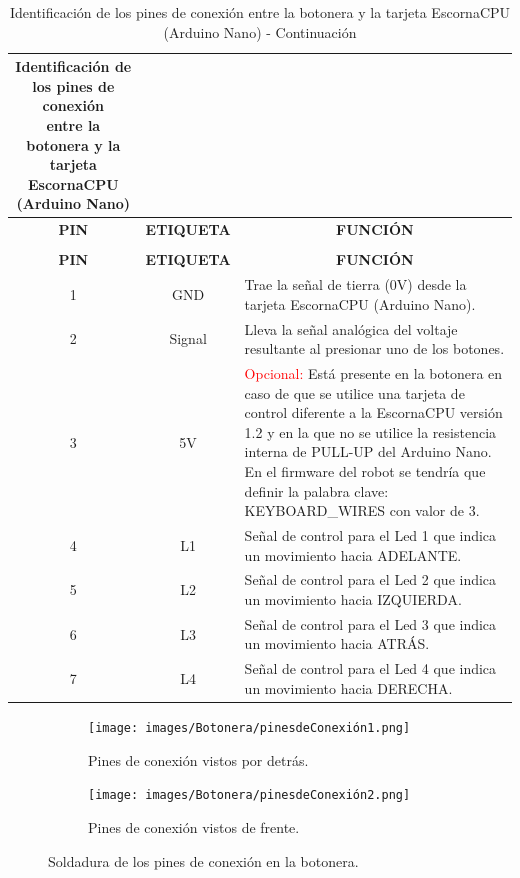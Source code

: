 \documentclass{article}
\begin{document}
\begin{longtable}{|c|c|m{}|}
    \caption{Identificación de los pines de conexión \\ entre la botonera y la tarjeta EscornaCPU (Arduino Nano)} \label{tab:pines_de_conexión} \\ \hline 
    \multicolumn{1}{|c|}{\cellcolor[HTML]{C0C0C0}\textbf{PIN}} &
    \multicolumn{1}{|c|}{\cellcolor[HTML]{C0C0C0}\textbf{ETIQUETA}} & \multicolumn{1}{c|}{\cellcolor[HTML]{C0C0C0}\textbf{FUNCIÓN}} \\ \hline 
    \endfirsthead
    \caption{Identificación de los pines de conexión entre la botonera y la tarjeta EscornaCPU (Arduino Nano) - Continuación} \\ \hline
    \multicolumn{1}{|c|}{\cellcolor[HTML]{C0C0C0}\textbf{PIN}} &
    \multicolumn{1}{|c|}{\cellcolor[HTML]{C0C0C0}\textbf{ETIQUETA}} & \multicolumn{1}{c|}{\cellcolor[HTML]{C0C0C0}\textbf{FUNCIÓN}} \\ \hline 
    \endhead
    1 & GND & Trae la señal de tierra (0V) desde la tarjeta EscornaCPU (Arduino Nano). \\ \hline
    2 & Signal & Lleva la señal analógica del voltaje resultante al presionar uno de los botones. \\ \hline
    3 & 5V & \textcolor{red}{Opcional:} Está presente en la botonera en caso de que se utilice una tarjeta de control diferente a la EscornaCPU versión 1.2 y en la que no se utilice la resistencia interna de PULL-UP del Arduino Nano. En el firmware del robot se tendría que definir la palabra clave: KEYBOARD\_WIRES con valor de 3. \\ \hline
    4 & L1 & Señal de control para el Led 1 que indica un movimiento hacia ADELANTE. \\ \hline
    5 & L2 & Señal de control para el Led 2 que indica un movimiento hacia IZQUIERDA. \\ \hline
    6 & L3 & Señal de control para el Led 3 que indica un movimiento hacia ATRÁS. \\ \hline
    7 & L4 & Señal de control para el Led 4 que indica un movimiento hacia DERECHA. \\ \hline
\end{longtable}

\begin{figure}[H]
    \centering
    \begin{subfigure}[t]{0.3\textwidth}
        \centering
        \texttt{[image: images/Botonera/pinesdeConexión1.png]}
        \caption{Pines de conexión vistos por detrás.}
        \label{fig:pines_de_conexión1}
    \end{subfigure}%
    \begin{subfigure}[t]{0.3\textwidth}
        \centering
        \texttt{[image: images/Botonera/pinesdeConexión2.png]}
        \caption{Pines de conexión vistos de frente.}
        \label{fig:pines_de_conexión2}
    \end{subfigure}
    \caption{Soldadura de los pines de conexión en la botonera.}
    \label{fig:pines_de_conexión}
\end{figure}
\end{document}
